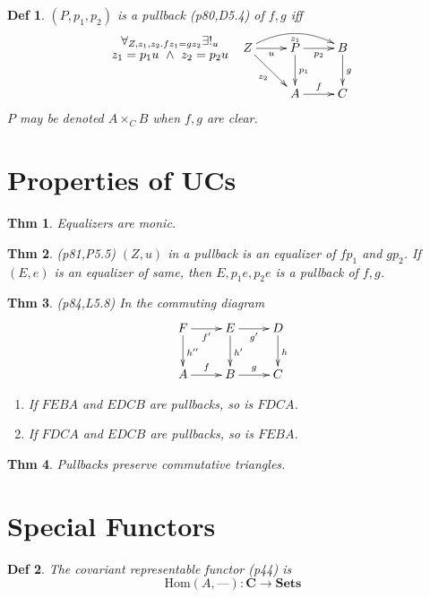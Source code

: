 \documentclass[10pt,twocolumn,letterpaper]{amsart}
\newtheorem{thm}{Thm}[section]
\newtheorem{dfn}{Def}[section]
\newcommand{\defn}[1]{\label{dfn:#1}{\em #1}}
\begin{document}
  \begin{dfn}$(P,p_1,p_2)$ is a \defn{pullback} (p80,D5.4) of $f,g$ iff
     \[\xymatrix{
     {}\save[]+<-1cm,0cm>*\txt<8pc>{$\forall_{Z,z_1,z_2 . fz_1 = gz_2}\exists!_u$\\$z_1 = p_1u ~\wedge~ z_2 = p_2u$}\restore
     & Z \ar[dr]_{z_2} \ar@/^1pc/[rr]_{z_1} \ar[r]_u & P \ar[d]^{p_1} \ar[r]_{p_2} & B \ar[d]^g \\
     &                                              & A \ar[r]^f & C
     }\]
     $P$ may be denoted $A \times_C B$ when $f,g$ are clear.
  \end{dfn}

\section{Properties of UCs}

  \begin{thm}Equalizers are monic.\end{thm}

  \begin{thm}(p81,P5.5) $(Z,u)$ in a pullback is an equalizer of $fp_1$ and $gp_2$.
    If $(E,e)$ is an equalizer of same, then $E,p_1e,p_2e$ is a pullback of $f,g$.
  \end{thm}

  \begin{thm}(p84,L5.8) In the commuting diagram
    \[\xymatrix{ F \ar[r]_{f'} \ar[d]^{h''} & E \ar[r]_{g'} \ar[d]^{h'} & D \ar[d]^{h} \\
       A \ar[r]^f & B \ar[r]^g & C
    }\]
    \begin{enumerate}
      \item If $FEBA$ and $EDCB$ are pullbacks, so is $FDCA$.
      \item If $FDCA$ and $EDCB$ are pullbacks, so is $FEBA$.
    \end{enumerate}
  \end{thm}

  \begin{thm}Pullbacks preserve commutative triangles.\end{thm}

\section{Special Functors}

  \begin{dfn}The \defn{covariant representable functor} (p44) is
     \[\mbox{Hom}(A,\text{---}) : \mathbf{C} \to \mathbf{Sets}\]
  \end{dfn}
\end{document}
